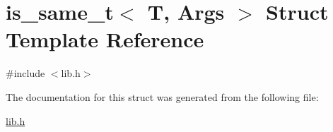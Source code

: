 \hypertarget{structis__same__t}{\section{is\-\_\-same\-\_\-t$<$ T, Args $>$ Struct Template Reference}
\label{structis__same__t}
}


{\ttfamily \#include $<$lib.\-h$>$}



The documentation for this struct was generated from the following file\-:\begin{DoxyCompactItemize}
\item 
\hyperlink{lib_8h}{lib.\-h}\end{DoxyCompactItemize}
